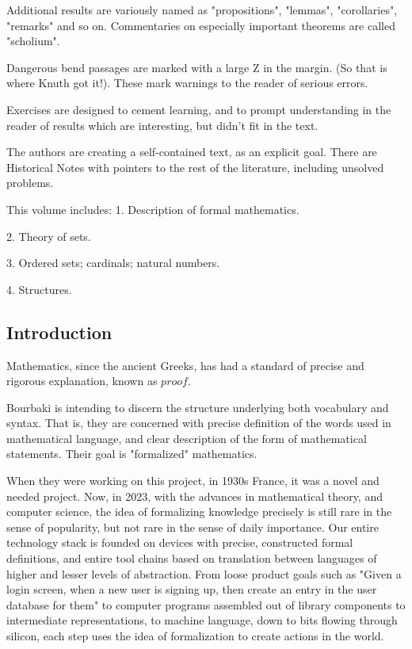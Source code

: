 \documentclass[]{scrartcl}
\begin{document}
Additional results are variously named as "propositions", "lemmas", "corollaries",
 "remarks" and so on. Commentaries on especially important theorems are called "scholium".

Dangerous bend passages are marked with a large Z in the margin. (So that is where Knuth got it!). These mark warnings to the reader of serious errors.

Exercises are designed to cement learning, and to prompt understanding in the reader of results which are interesting, but didn't fit in the text.

The authors are creating a self-contained text, as an explicit goal. There are Historical Notes with pointers to the rest of the literature, including unsolved problems.

This volume includes:
1. Description of formal mathematics.

2. Theory of sets.

3. Ordered sets; cardinals; natural numbers.

4. Structures.

\subsection{Introduction}

Mathematics, since the ancient Greeks, has had a standard of precise and rigorous explanation, known as ${proof}$.

Bourbaki is intending to discern the structure underlying both vocabulary and syntax. That is, they are concerned with precise definition of the words used in mathematical language, and clear description of the form of mathematical statements. Their goal is "formalized" mathematics.

When they were working on this project, in 1930s France, it was a novel and needed project. Now, in 2023, with the advances in mathematical theory, and computer science, the idea of formalizing knowledge precisely is still rare in the sense of popularity, but not rare in the sense of daily importance. Our entire technology stack is founded on devices with precise, constructed formal definitions, and entire tool chains based on translation between languages of higher and lesser levels of abstraction. From loose product goals such as "Given a login screen, when a new user is signing up, then create an entry in the user database for them" to computer programs assembled out of library components to intermediate representations, to machine language, down to bits flowing through silicon, each step uses the idea of formalization to create actions in the world.
\end{document}

